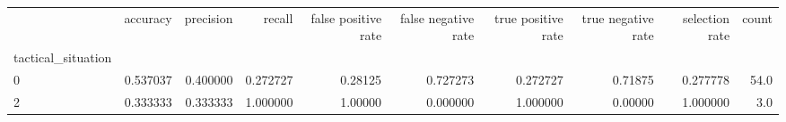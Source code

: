 \begin{tabular}{lrrrrrrrrr}
\toprule
{} &  accuracy &  precision &    recall &  false positive rate &  false negative rate &  true positive rate &  true negative rate &  selection rate &  count \\
tactical\_situation &           &            &           &                      &                      &                     &                     &                 &        \\
\midrule
0                  &  0.537037 &   0.400000 &  0.272727 &              0.28125 &             0.727273 &            0.272727 &             0.71875 &        0.277778 &   54.0 \\
2                  &  0.333333 &   0.333333 &  1.000000 &              1.00000 &             0.000000 &            1.000000 &             0.00000 &        1.000000 &    3.0 \\
\bottomrule
\end{tabular}
